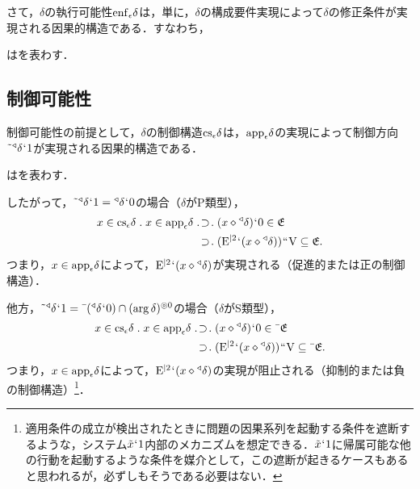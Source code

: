 さて，$\delta$の執行可能性$\enf{\epsilon}\delta$は，単に，$\delta$の構成要件実現によって$\delta$の修正条件が実現される因果的構造である．すなわち，

\begin{df}
\label{df:執行可能性}
\kagi{$
    \enf{\epsilon}\delta
$}はを表わす．
\end{df}

\subsection{制御可能性}
\label{ssec:制御可能性}

制御可能性の前提として，$\delta$の制御構造$ \cs{\epsilon}\delta $は，$\mathrm{app}_{\epsilon}\delta$の実現によって制御方向$\tilde{\:\:}{^\triangleleft}\delta{\mspace{1mu}{`}\mspace{1mu}} 1$が実現される因果的構造である．

\begin{df}
\label{df:制御構造}
\kagi{$
    \cs{\epsilon}\delta
$}はを表わす．
\end{df}

\noindent したがって，$ \tilde{\:\:}{^\triangleleft}\delta{\mspace{1mu}{`}\mspace{1mu}} 1 = {^\triangleleft}\delta{\mspace{1mu}{`}\mspace{1mu}} 0 $の場合（$ \delta $がP類型），
\begin{align*}
    x\in\cs{\epsilon}\delta\con{1}x\in\app{\epsilon} \delta & \case{1}{1}{1}(x\diamond\trgl{\delta})\fap 0\in\mathfrak{E}\\
    &\:\, \case{1}{0}{1}(\iter{\mathrm{E}}{2}\fap(x\diamond\trgl{\delta}))\img\univ\subseteq \mathfrak{E}.
\end{align*}
つまり，$ x\in\mathrm{app}_{\epsilon}\delta $によって，$ \mathrm{E}^{\mid 2}{\mspace{1mu}{`}\mspace{1mu}}(x\diamond{^\triangleleft}\delta) $が実現される（促進的または正の制御構造）．

他方，$ \tilde{\:\:}{^\triangleleft}\delta{\mspace{1mu}{`}\mspace{1mu}} 1 = \bar{\:\:}({^\triangleleft}\delta{\mspace{1mu}{`}\mspace{1mu}} 0)\cap(\arg\delta)^{\circledcirc 0} $の場合（$ \delta $がS類型），
\begin{align*}
    x\in\cs{\epsilon}\delta\con{1}x\in\app{\epsilon} \delta & \case{1}{1}{1}(x\diamond\trgl{\delta})\fap 0\in\barl{\mathfrak{E}}\\
    &\:\, \case{1}{0}{1}(\iter{\mathrm{E}}{2}\fap(x\diamond\trgl{\delta}))\img\univ\subseteq\barl{\mathfrak{E}}.
\end{align*}
つまり，$ x\in\mathrm{app}_{\epsilon}\delta $によって，$ \mathrm{E}^{\mid 2}{\mspace{1mu}{`}\mspace{1mu}}(x\diamond{^\triangleleft}\delta) $の実現が阻止される（抑制的または負の制御構造）\footnote{
    適用条件の成立が検出されたときに問題の因果系列を起動する条件を遮断するような，システム$ \tilde{x}{\mspace{1mu}{`}\mspace{1mu}} 1 $内部のメカニズムを想定できる．$ \tilde{x}{\mspace{1mu}{`}\mspace{1mu}} 1 $に帰属可能な他の行動を起動するような条件を媒介として，この遮断が起きるケースもあると思われるが，必ずしもそうである必要はない．
}．

